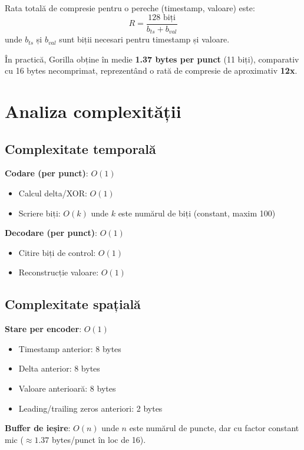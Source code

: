 Rata totală de compresie pentru o pereche (timestamp, valoare) este:
\begin{equation}
    R = \frac{128 \text{ biți}}{b_{ts} + b_{val}}
\end{equation}
unde $b_{ts}$ și $b_{val}$ sunt biții necesari pentru timestamp și valoare.

În practică, Gorilla obține în medie \textbf{1.37 bytes per punct} (11 biți), comparativ cu 16 bytes necomprimat, reprezentând o rată de compresie de aproximativ \textbf{12x}.

\section{Analiza complexității}

\subsection{Complexitate temporală}

\textbf{Codare (per punct)}: $O(1)$
\begin{itemize}
    \item Calcul delta/XOR: $O(1)$
    \item Scriere biți: $O(k)$ unde $k$ este numărul de biți (constant, maxim 100)
\end{itemize}

\textbf{Decodare (per punct)}: $O(1)$
\begin{itemize}
    \item Citire biți de control: $O(1)$
    \item Reconstrucție valoare: $O(1)$
\end{itemize}

\subsection{Complexitate spațială}

\textbf{Stare per encoder}: $O(1)$
\begin{itemize}
    \item Timestamp anterior: 8 bytes
    \item Delta anterior: 8 bytes
    \item Valoare anterioară: 8 bytes
    \item Leading/trailing zeros anteriori: 2 bytes
\end{itemize}

\textbf{Buffer de ieșire}: $O(n)$ unde $n$ este numărul de puncte, dar cu factor constant mic ($\approx 1.37$ bytes/punct în loc de 16).

